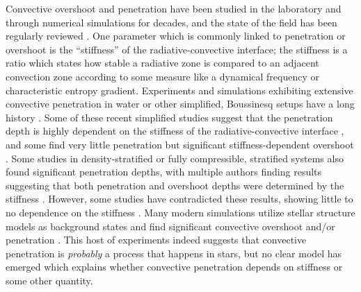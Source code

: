 \documentclass[twocolumn]{aastex631}
\begin{document}
Convective overshoot and penetration have been studied in the laboratory and through numerical simulations for decades, and the state of the field has been regularly reviewed \citep[e.g.,][]{marcus_etal_1983, zahn1991, browning_etal_2004, rogers_etal_2006, viallet_etal_2015, korre_etal_2019}.
One parameter which is commonly linked to penetration or overshoot is the ``stiffness'' of the radiative-convective interface; the stiffness is a ratio which states how stable a radiative zone is compared to an adjacent convection zone according to some measure like a dynamical frequency or characteristic entropy gradient.
Experiments and simulations exhibiting extensive convective penetration in water or other simplified, Boussinesq setups have a long history \citep{ musman1968, deardorff_etal_1969, moore_weiss_1973}.
Some of these recent simplified studies suggest that the penetration depth is highly dependent on the stiffness of the radiative-convective interface \citep{couston_etal_2017, toppaladoddi_wettlaufer_2018}, and some find very little penetration but significant stiffness-dependent overshoot \citep{korre_etal_2019}.
Some studies in density-stratified or fully compressible, stratified systems \citep[e.g.,][]{hurlburt_etal_1986, saikia_etal_2000} also found significant penetration depths, with multiple authors finding results suggesting that both penetration and overshoot depths were determined by the stiffness \citep{hurlburt_etal_1994, singh_etal_1995, browning_etal_2004, dietrich_wicht_2018}.
However, some studies have contradicted these results, showing little to no dependence on the stiffness \citep{brummell_etal_2002, rogers_glatzmaier_2005}.
Many modern simulations utilize stellar structure models as background states and find significant convective overshoot and/or penetration \citep{browning_etal_2004, rogers_etal_2006, kitiashvili_etal_2016, brun_etal_2017, pratt_etal_2017, higl_etal_2021}.
This host of experiments indeed suggests that convective penetration is \emph{probably} a process that happens in stars, but no clear model has emerged which explains whether convective penetration depends on stiffness or some other quantity.
\end{document}
